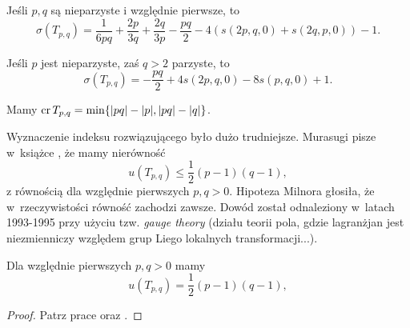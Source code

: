 \begin{corollary}
    Jeśli $p, q$ są nieparzyste i względnie pierwsze, to
    \begin{equation}
        \sigma(T_{p,q}) = \frac{1}{6pq} + \frac{2p}{3q} + \frac{2q}{3p} - \frac{pq}{2} - 4(s(2p, q, 0) + s(2q, p, 0)) - 1.
    \end{equation}
\end{corollary}

\begin{corollary}
    Jeśli $p$ jest nieparzyste, zaś $q > 2$ parzyste, to
    \begin{equation}
        \sigma(T_{p,q}) = - \frac{pq}{2} + 4s(2p, q, 0) - 8s(p, q, 0) + 1.
    \end{equation}
\end{corollary}

\begin{proposition}[Murasugi, 1991]
    Mamy $\operatorname{cr} T_{p, q} = \min \{|pq| - |p|, |pq| - |q|\}$.
\end{proposition}

Wyznaczenie indeksu rozwiązującego było dużo trudniejsze.
Murasugi pisze w~książce \cite{murasugi96}, że mamy nierówność
\begin{equation}
    u(T_{p, q}) \le \frac 12 (p-1)(q-1),
\end{equation}
z równością dla względnie pierwszych $p, q > 0$.
Hipoteza Milnora głosiła, że w~rzeczywistości równość zachodzi zawsze.
Dowód został odnaleziony w~latach 1993-1995 przy użyciu tzw. \emph{gauge theory} (działu teorii pola, gdzie lagranżjan jest niezmienniczy względem grup Liego lokalnych transformacji...).

\begin{proposition}
    \label{prp:torus_unknotting_number}
    Dla względnie pierwszych $p, q > 0$ mamy
    \begin{equation}
        u(T_{p, q}) = \frac 12 (p - 1)(q - 1),
    \end{equation}
\end{proposition}

\begin{proof}
    Patrz prace \cite{kronheimer93} oraz \cite{kronheimer95}.
\end{proof}

